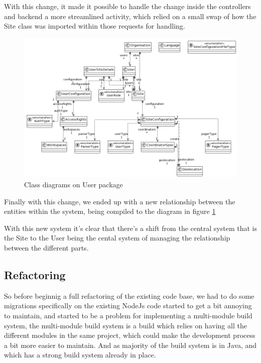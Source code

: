 With this change, it made it possible to handle the change inside the controllers and
backend a more streamlined activity, which relied on a small swap of how the Site 
class was imported within those requests for handling.

\begin{figure}
    \centering
    \includegraphics[width=\textwidth]{images/package.png}
    \caption{Class diagrams on User package}
    \label{fig:cd_entities}
\end{figure}

Finally with this change, we ended up with a new relationship between the entities
within the system, being compiled to the diagram in figure \ref{fig:cd_entities}

With this new system it's clear that there's a shift from the central system
that is the Site to the User being the cental system of managing the relationship
between the different parts.

\subsection {Refactoring}

So before beginnig a full refactoring of the existing code base, we had to do some migrations
specifically on the existing NodeJs code started to get a bit annoying to maintain, and
started to be a problem for implementing a multi-module build system, the multi-module build
system is a build which relies on having all the different modules in the same project,
which could make the development process a bit more easier to maintain. And as majority
of the build system is in Java, and which has a strong build system already in place.

